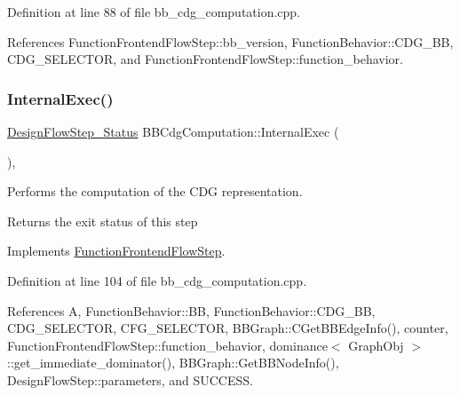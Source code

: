 Definition at line 88 of file bb\+\_\+cdg\+\_\+computation.\+cpp.



References Function\+Frontend\+Flow\+Step\+::bb\+\_\+version, Function\+Behavior\+::\+C\+D\+G\+\_\+\+BB, C\+D\+G\+\_\+\+S\+E\+L\+E\+C\+T\+OR, and Function\+Frontend\+Flow\+Step\+::function\+\_\+behavior.

\mbox{\label{classBBCdgComputation_a104af4ec42e6e2057cb89385dd768f02}} 
\subsubsection{\texorpdfstring{Internal\+Exec()}{InternalExec()}}
{\footnotesize\ttfamily \hyperlink{design__flow__step_8hpp_afb1f0d73069c26076b8d31dbc8ebecdf}{Design\+Flow\+Step\+\_\+\+Status} B\+B\+Cdg\+Computation\+::\+Internal\+Exec (\begin{DoxyParamCaption}{ }\end{DoxyParamCaption})\hspace{0.3cm}{\ttfamily [override]}, {\ttfamily [virtual]}}



Performs the computation of the C\+DG representation. 

\begin{DoxyReturn}{Returns}
the exit status of this step 
\end{DoxyReturn}


Implements \hyperlink{classFunctionFrontendFlowStep_a00612f7fb9eabbbc8ee7e39d34e5ac68}{Function\+Frontend\+Flow\+Step}.



Definition at line 104 of file bb\+\_\+cdg\+\_\+computation.\+cpp.



References A, Function\+Behavior\+::\+BB, Function\+Behavior\+::\+C\+D\+G\+\_\+\+BB, C\+D\+G\+\_\+\+S\+E\+L\+E\+C\+T\+OR, C\+F\+G\+\_\+\+S\+E\+L\+E\+C\+T\+OR, B\+B\+Graph\+::\+C\+Get\+B\+B\+Edge\+Info(), counter, Function\+Frontend\+Flow\+Step\+::function\+\_\+behavior, dominance$<$ Graph\+Obj $>$\+::get\+\_\+immediate\+\_\+dominator(), B\+B\+Graph\+::\+Get\+B\+B\+Node\+Info(), Design\+Flow\+Step\+::parameters, and S\+U\+C\+C\+E\+SS.


